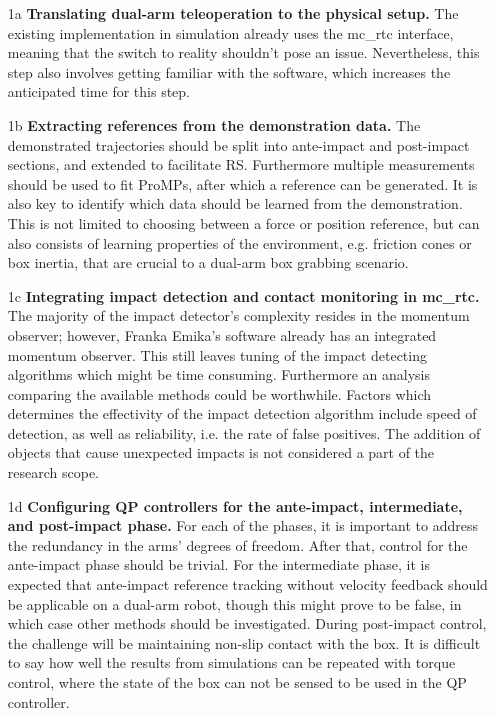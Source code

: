 \documentclass[11pt]{report}
\numberwithin{equation}{section}        %
\numberwithin{figure}{section}          %
\numberwithin{table}{section}           %
\begin{document}
  \begin{enumerate}
  \item[1a] \textbf{Translating dual-arm teleoperation to the physical setup.} The existing implementation in simulation already uses the mc\_rtc interface, meaning that the switch to reality shouldn't pose an issue. Nevertheless, this step also involves getting familiar with the software, which increases the anticipated time for this step.
  \item[1b] \textbf{Extracting references from the demonstration data.} The demonstrated trajectories should be split into ante-impact and post-impact sections, and extended to facilitate RS. Furthermore multiple measurements should be used to fit ProMPs, after which a reference can be generated. It is also key to identify which data should be learned from the demonstration. This is not limited to choosing between a force or position reference, but can also consists of learning properties of the environment, e.g. friction cones or box inertia, that are crucial to a dual-arm box grabbing scenario.
  \item[1c] \textbf{Integrating impact detection and contact monitoring in mc\_rtc.} The majority of the impact detector's complexity resides in the momentum observer; however, Franka Emika's software already has an integrated momentum observer. This still leaves tuning of the impact detecting algorithms which might be time consuming. Furthermore an analysis comparing the available methods could be worthwhile. Factors which determines the effectivity of the impact detection algorithm include speed of detection, as well as reliability, i.e. the rate of false positives. The addition of objects that cause unexpected impacts is not considered a part of the research scope.
  \item[1d] \textbf{Configuring QP controllers for the ante-impact, intermediate, and post-impact phase.} For each of the phases, it is important to address the redundancy in the arms' degrees of freedom. After that, control for the ante-impact phase should be trivial. For the intermediate phase, it is expected that ante-impact reference tracking without velocity feedback should be applicable on a dual-arm robot, though this might prove to be false, in which case other methods should be investigated. During post-impact control, the challenge will be maintaining non-slip contact with the box. It is difficult to say how well the results from simulations can be repeated with torque control, where the state of the box can not be sensed to be used in the QP controller.

\end{enumerate}
\end{document}
